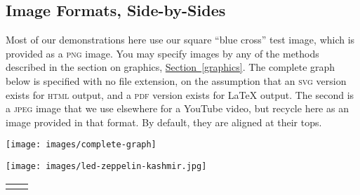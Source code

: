 \documentclass[10pt,]{article}
\newcommand{\initialism}[1]{\textsc{\MakeLowercase{#1}}}
\theoremstyle{plain}
\theoremstyle{definition}
\theoremstyle{definition}
\theoremstyle{definition}
\theoremstyle{definition}
\theoremstyle{definition}
\theoremstyle{definition}
\numberwithin{equation}{section}
\newlength{\panelmax}
\begin{document}
\subsection[{Image Formats, Side-by-Sides}]{Image Formats, Side-by-Sides}\label{subsection-42}
\hypertarget{p-678}{}%
Most of our demonstrations here use our square ``blue cross'' test image, which is provided as a \initialism{PNG} image.  You may specify images by any of the methods described in the section on graphics, \hyperref[graphics]{Section~\ref{graphics}}.  The complete graph below is specified with no file extension, on the assumption that an \initialism{SVG} version exists for \initialism{HTML} output, and a \initialism{PDF} version exists for \LaTeX{} output.  The second is a \initialism{JPEG} image that we use elsewhere for a YouTube video, but recycle here as an image provided in that format.  By default, they are aligned at their tops.%
{%
\setlength{\panelmax}{0pt}
\ifdefined\panelboxAimage\else\newsavebox{\panelboxAimage}\fi%
\begin{lrbox}{\panelboxAimage}
\texttt{[image: images/complete-graph]}
\end{lrbox}
\ifdefined\phAimage\else\newlength{\phAimage}\fi%
\setlength{\phAimage}{\ht\panelboxAimage+\dp\panelboxAimage}
\settototalheight{\phAimage}{\usebox{\panelboxAimage}}
\setlength{\panelmax}{\maxof{\panelmax}{\phAimage}}
\ifdefined\panelboxBimage\else\newsavebox{\panelboxBimage}\fi%
\begin{lrbox}{\panelboxBimage}
\texttt{[image: images/led-zeppelin-kashmir.jpg]}
\end{lrbox}
\ifdefined\phBimage\else\newlength{\phBimage}\fi%
\setlength{\phBimage}{\ht\panelboxBimage+\dp\panelboxBimage}
\settototalheight{\phBimage}{\usebox{\panelboxBimage}}
\setlength{\panelmax}{\maxof{\panelmax}{\phBimage}}
\leavevmode%
\setlength{\tabcolsep}{0.1\linewidth}
\par\medskip\noindent
\hspace*{0.1\linewidth}%
\begin{tabular}{@{}*{2}{c}@{}}
\begin{minipage}[c][\panelmax][t]{0.3\linewidth}\usebox{\panelboxAimage}\end{minipage}&
\begin{minipage}[c][\panelmax][t]{0.3\linewidth}\usebox{\panelboxBimage}\end{minipage}\end{tabular}\\
}%
\end{document}
